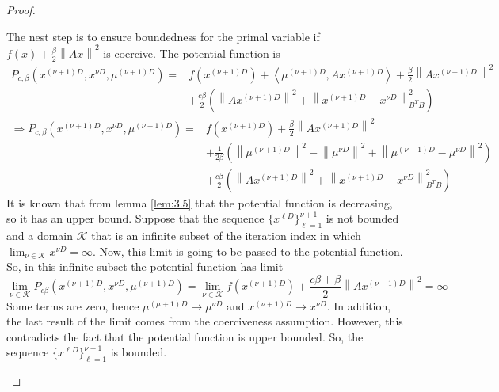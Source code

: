 \begin{proof}
\begin{enumerate}
            The nest step is to ensure boundedness for the primal variable if $f(x) + \frac{\beta}{2} \left \lVert Ax \right \rVert^2$ is coercive. The potential function is
            \begin{equation*}
                \begin{align}
                    P_{c, \beta} (x^{(\nu + 1)D}, x^{\nu D}, \mu^{(\nu + 1)D}) = &f(x^{(\nu + 1)D}) + \left \langle \mu^{(\nu + 1)D}, Ax^{(\nu + 1)D}\right\rangle + \frac{\beta}{2} \left \lVert Ax^{(\nu + 1)D} \right \rVert^2\\
                    &+ \frac{c\beta}{2}\left(\left \lVert Ax^{(\nu + 1)D} \right \rVert^2 + \left \lVert x^{(\nu + 1)D} - x^{\nu D}\right \rVert^2_{B^TB} \right)
                \end{align}
            \end{equation*}
            \begin{equation*}
                \begin{align}
                    \Rightarrow P_{c, \beta} (x^{(\nu + 1)D}, x^{\nu D}, \mu^{(\nu + 1)D}) = &f(x^{(\nu + 1)D}) + \frac{\beta}{2} \left \lVert Ax^{(\nu + 1)D} \right \rVert^2\\
                     &+ \frac{1}{2\beta}\left( \left\lVert \mu^{(\nu + 1)D}\right\rVert^2 - \left\lVert \mu^{\nu D}\right\rVert^2 + \left\lVert \mu^{(\nu + 1)D} - \mu^{\nu D}\right\rVert^2\right)\\
                    &+ \frac{c\beta}{2}\left(\left \lVert Ax^{(\nu + 1)D} \right \rVert^2 + \left \lVert x^{(\nu + 1)D} - x^{\nu D}\right \rVert^2_{B^TB} \right)
                \end{align}
            \end{equation*}
            It is known that from lemma \ref{lem:3.5} that the potential function is decreasing, so it has an upper bound. Suppose that the sequence $\{x^{\ell D}\}_{\ell = 1}^{\nu + 1}$ is not bounded and a domain $\mathcal{K}$ that is an infinite subset of the iteration index in which $\lim_{\nu \in \mathcal{K}}x^{\nu D} = \infty$. Now, this limit is going to be passed to the potential function. So, in this infinite subset the potential function has limit
            \begin{equation*}
                \lim_{\nu \in \mathcal{K}} P_{c\beta}(x^{(\nu + 1)D}, x^{\nu D}, \mu^{(\nu + 1)D}) = \lim_{\nu \in \mathcal{K}} f(x^{(\nu + 1)D}) + \frac{c\beta + \beta}{2}\left \lVert Ax^{(\nu + 1)D} \right \rVert^2 = \infty
            \end{equation*}
            Some terms are zero, hence $\mu^{(\mu + 1)D} \to \mu^{\nu D}$ and $x^{(\nu + 1)D} \to x^{\nu D}$. In addition, the last result of the limit comes from the coerciveness assumption. However, this contradicts the fact that the potential function is upper bounded. So, the sequence $\{x^{\ell D}\}_{\ell = 1}^{\nu + 1}$ is bounded.


\end{enumerate}
\end{proof}
